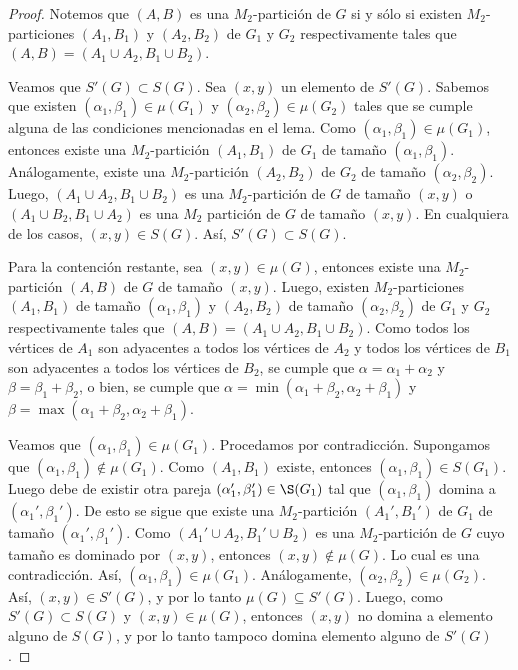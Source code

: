 \begin{proof}
Notemos que $(A,B)$ es una $M_2$-partición de $G$ si y sólo si existen $M_2$-particiones $(A_1,B_1)$ y $(A_2,B_2)$ de $G_1$ y $G_2$ respectivamente tales que $(A,B)=(A_1\cup A_2, B_1 \cup B_2)$.

Veamos que $S'(G)\subset S(G)$. Sea $(x,y)$ un elemento de $S'(G)$. Sabemos que existen $(\alpha_1,\beta_1)\in \mu(G_1)$ y $(\alpha_2,\beta_2)\in \mu(G_2)$ tales que se cumple alguna de las condiciones mencionadas en el lema. Como $(\alpha_1,\beta_1)\in \mu(G_1)$, entonces existe una $M_2$-partición $(A_1,B_1)$ de $G_1$ de tamaño $(\alpha_1, \beta_1)$. Análogamente, existe una $M_2$-partición $(A_2,B_2)$ de $G_2$ de tamaño $(\alpha_2, \beta_2)$. Luego, $(A_1\cup A_2, B_1 \cup B_2)$ es una $M_2$-partición de $G$ de tamaño $(x,y)$ o $(A_1\cup B_2, B_1 \cup A_2)$ es una $M_2$ partición de $G$ de tamaño $(x,y)$. En cualquiera de los casos, $(x,y)\in S(G)$. Así, $S'(G)\subset S(G)$.

Para la contención restante, sea $(x,y)\in\mu(G)$, entonces existe una $M_2$-partición $(A,B)$ de $G$ de tamaño $(x,y)$. Luego, existen $M_2$-particiones $(A_1,B_1)$ de tamaño $(\alpha_1, \beta_1)$ y $(A_2,B_2)$ de tamaño $(\alpha_2, \beta_2)$ de $G_1$ y $G_2$ respectivamente tales que $(A,B)=(A_1\cup A_2, B_1 \cup B_2)$. Como todos los vértices de $A_1$ son adyacentes a todos los vértices de $A_2$ y todos los vértices de $B_1$ son adyacentes a todos los vértices de $B_2$, se cumple que $\alpha = \alpha_1+\alpha_2$ y $\beta = \beta_1 + \beta_2$, o bien, se cumple que $\alpha = \min (\alpha_1+\beta_2, \alpha_2+\beta_1)$ y $\beta = \max (\alpha_1+\beta_2, \alpha_2+\beta_1)$.

Veamos que $(\alpha_1, \beta_1)\in\mu(G_1)$. Procedamos por contradicción. Supongamos que $(\alpha_1, \beta_1)\notin\mu(G_1)$. Como $(A_1,B_1)$ existe, entonces $(\alpha_1, \beta_1)\in S(G_1)$. Luego debe de existir otra pareja $(\alpha_1', \beta_1')\in\S(G_1)$ tal que $(\alpha_1, \beta_1)$ domina a $(\alpha_1', \beta_1')$. De esto se sigue que existe una $M_2$-partición $(A_1',B_1')$ de $G_1$ de tamaño $(\alpha_1', \beta_1')$. Como $(A_1'\cup A_2, B_1'\cup B_2)$ es una $M_2$-partición de $G$ cuyo tamaño es dominado por $(x,y)$, entonces $(x,y)\notin\mu(G)$. Lo cual es una contradicción. Así, $(\alpha_1, \beta_1)\in\mu(G_1)$. Análogamente, $(\alpha_2, \beta_2)\in\mu(G_2)$. Así, $(x,y)\in S'(G)$, y por lo tanto $\mu(G)\subseteq S'(G)$. Luego, como $S'(G)\subset S(G)$ y $(x,y)\in\mu(G)$, entonces $(x,y)$ no domina a elemento alguno de $S(G)$, y por lo tanto tampoco domina elemento alguno de $S'(G)$.


\end{proof}
